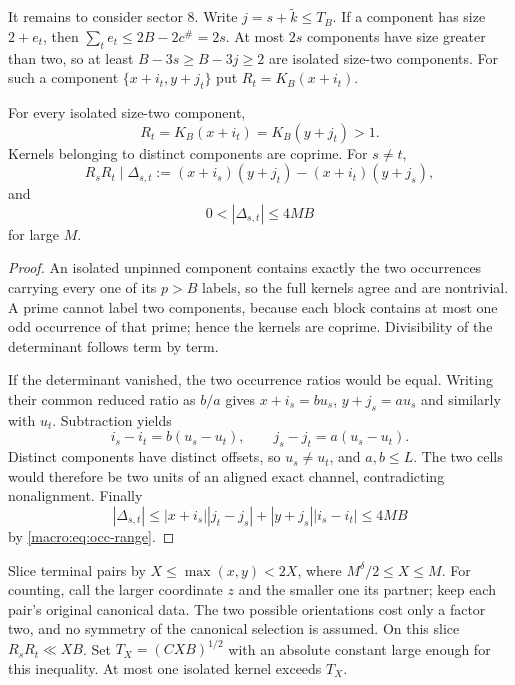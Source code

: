 It remains to consider sector 8. Write $j=s+\widetilde k\le T_B$.
If a component has size $2+e_t$, then
$\sum_t e_t\le2B-2c^\#=2s$. At most $2s$ components have size greater
than two, so at least $B-3s\ge B-3j\ge2$ are isolated size-two
components. For such a component $\{x+i_t,y+j_t\}$ put
$R_t=K_B(x+i_t)$.
\begin{lemma}\label{macro:lem:determinant}
For every isolated size-two component,
\[
 R_t=K_B(x+i_t)=K_B(y+j_t)>1.
\]
Kernels belonging to distinct components are coprime.  For $s\neq t$,
\[
 R_sR_t\mid
 \Delta_{s,t}:=(x+i_s)(y+j_t)-(x+i_t)(y+j_s),
\]
and
\[
 0<|\Delta_{s,t}|\leq4MB
\]
for large $M$.
\end{lemma}

\begin{proof}
An isolated unpinned component contains exactly the two occurrences
carrying every one of its $p>B$ labels, so the full kernels agree and
are nontrivial.  A prime cannot label two components, because each
block contains at most one odd occurrence of that prime; hence the
kernels are coprime.  Divisibility of the determinant follows term by
term.

If the determinant vanished, the two occurrence ratios would be equal.
Writing their common reduced ratio as $b/a$ gives
$x+i_s=bu_s$, $y+j_s=au_s$ and similarly with $u_t$.  Subtraction yields
\[
 i_s-i_t=b(u_s-u_t),
 \qquad j_s-j_t=a(u_s-u_t).
\]
Distinct components have distinct offsets, so $u_s\neq u_t$, and
$a,b\leq L$.  The two cells would therefore be two units of an aligned
exact channel, contradicting nonalignment.  Finally
\[
 |\Delta_{s,t}|
 \leq|x+i_s||j_t-j_s|+|y+j_s||i_s-i_t|
 \leq4MB
\]
by \eqref{macro:eq:occ-range}.
\end{proof}
Slice terminal pairs by $X\le\max(x,y)<2X$, where
$M^\delta/2\le X\le M$. For counting, call the larger coordinate $z$
and the smaller one its partner; keep each pair's original canonical data.
The two possible orientations cost only a factor two, and no symmetry
of the canonical selection is assumed. On this slice
$R_sR_t\ll XB$. Set $T_X=(C XB)^{1/2}$ with an absolute constant large
enough for this inequality. At most one isolated kernel exceeds $T_X$.

